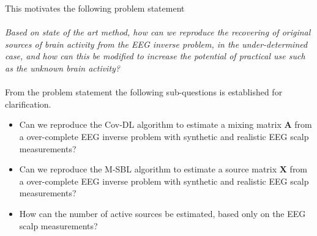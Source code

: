 \clearpage

This motivates the following problem statement
\\ \\
\textit{Based on state of the art method, how can we reproduce the recovering of original sources of brain activity from the EEG inverse problem, in the under-determined case, and how can this be modified to increase the potential of practical use such as the unknown brain activity?}
\\ \\
From the problem statement the following sub-questions is established for clarification.
\begin{itemize}
\item Can we reproduce the Cov-DL algorithm to estimate a mixing matrix $\mathbf{A}$ from a over-complete EEG inverse problem with synthetic and realistic EEG scalp measurements?
\item Can we reproduce the M-SBL algorithm to estimate a source matrix $\mathbf{X}$ from a over-complete EEG inverse problem with synthetic and realistic EEG scalp measurements?
\item How can the number of active sources be estimated, based only on the EEG scalp measurements? 
\end{itemize}

 